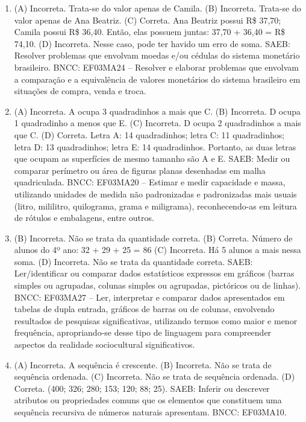 \begin{enumerate}
\item
(A) Incorreta. Trata-se do valor apenas de Camila.
(B) Incorreta. Trata-se do valor apenas de Ana Beatriz.
(C) Correta. Ana Beatriz possui R\$ 37,70; Camila possui R\$ 36,40. Então, elas possuem juntas: 37,70 + 36,40 = R\$ 74,10.
(D) Incorreta. Nesse caso, pode ter havido um erro de soma.
SAEB: Resolver problemas que envolvam moedas e/ou cédulas do
sistema monetário brasileiro.
BNCC: EF03MA24 -- Resolver e elaborar problemas que envolvam a comparação e a equivalência de
valores monetários do sistema brasileiro em situações de compra, venda e troca.

\item
(A) Incorreta. A ocupa 3 quadradinhos a mais que C.
(B) Incorreta. D ocupa 1 quadradinho a menos que E.
(C) Incorreta. D ocupa 2 quadradinhos a mais que C.
(D) Correta. Letra A: 14 quadradinhos; letra C: 11 quadradinhos; letra D: 13 quadradinhos; letra E: 14 quadradinhos. Portanto, as duas letras que ocupam as superfícies de mesmo tamanho são A e E.
SAEB: Medir ou comparar perímetro ou área de figuras planas
desenhadas em malha quadriculada.
BNCC: EF03MA20 -- Estimar e medir capacidade e massa, utilizando unidades de medida não
padronizadas e padronizadas mais usuais (litro, mililitro, quilograma, grama e miligrama),
reconhecendo-as em leitura de rótulos e embalagens, entre outros.

\item
(B) Incorreta. Não se trata da quantidade correta.
(B) Correta. Número de alunos do 4º ano: 32 + 29 + 25 = 86 
(C) Incorreta. Há 5 alunos a mais nessa soma.
(D) Incorreta. Não se trata da quantidade correta.
SAEB: Ler/identificar ou comparar dados estatísticos
expressos em gráficos (barras simples ou agrupadas, colunas simples ou
agrupadas, pictóricos ou de linhas).
BNCC: EF03MA27 -- Ler, interpretar e comparar dados apresentados em tabelas de dupla entrada,
gráficos de barras ou de colunas, envolvendo resultados de pesquisas significativas, utilizando
termos como maior e menor frequência, apropriando-se desse tipo de linguagem para
compreender aspectos da realidade sociocultural significativos.

\item
(A) Incorreta. A sequência é crescente.
(B) Incorreta. Não se trata de sequência ordenada.
(C) Incorreta. Não se trata de sequência ordenada.
(D) Correta. (400; 326; 280; 153; 120; 88; 25).
SAEB: Inferir ou descrever atributos ou propriedades comuns
que os elementos que constituem uma sequência recursiva de números
naturais apresentam.
BNCC: EF03MA10.


\end{enumerate}
